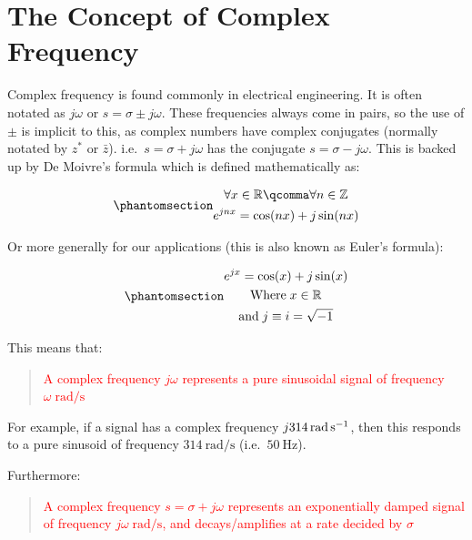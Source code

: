 \documentclass[
  14pt,
  a4paper,
  oneside,
  open=any,
  a4paper,
  14pt]{report}
\begin{document}
\section{The Concept of Complex
Frequency}\label{the-concept-of-complex-frequency}

Complex frequency is found commonly in electrical engineering. It is
often notated as \(j\omega\) or \(s = \sigma \pm j\omega\). These
frequencies always come in pairs, so the use of \(\pm\) is implicit to
this, as complex numbers have complex conjugates (normally notated by
\(z^*\) or \(\bar{z}\)). i.e.~\(s = \sigma + j\omega\) has the conjugate
\(s=\sigma - j\omega\). This is backed up by De Moivre's formula which
is defined mathematically as:

\begin{equation}\phantomsection\label{eq-de-moivre}{
\begin{gathered}
    \forall x \in \mathbb{R}\qcomma\forall n \in \mathbb{Z} \\
    e^{jnx} = \cos(n x) + j \sin(n x)  
\end{gathered}
}\end{equation}

Or more generally for our applications (this is also known as Euler's
formula):

\begin{equation}\phantomsection\label{eq-euler}{
\begin{gathered}
    e^{jx} = \cos(x) + j \sin(x) \\
    \text{Where}\; x \in \mathbb{R} \\
    \text{and}\; j \equiv i = \sqrt{-1}
\end{gathered}
}\end{equation}

This means that:

\begin{quote}
\textcolor{red}{A complex frequency \(j\omega\) represents a pure
sinusoidal signal of frequency \(\omega\;\unit{\radian\per\second}\)}
\end{quote}

For example, if a signal has a complex frequency
\(\complexqty[output-complex-root=j, complex-root-position=before-number]{314i}{\radian\per\second}\),
then this responds to a pure sinusoid of frequency
\(\SI{314}{\radian\per\second}\) (i.e.~\(\SI{50}{\hertz}\)).

Furthermore:

\begin{quote}
\textcolor{red}{A complex frequency \(s = \sigma + j\omega\) represents
an exponentially damped signal of frequency
\(j\omega\;\unit{\radian\per\second}\), and decays/amplifies at a rate
decided by \(\sigma\)}
\end{quote}
\end{document}
